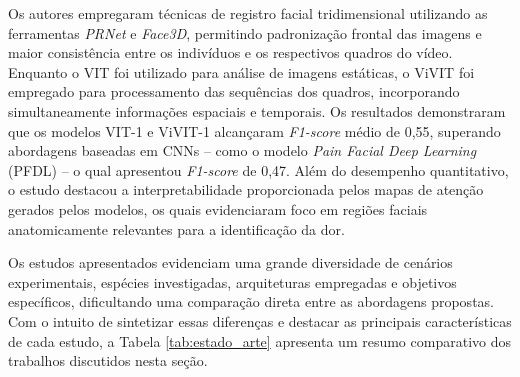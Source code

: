 Os autores empregaram técnicas de registro facial tridimensional utilizando as ferramentas \textit{PRNet} e \textit{Face3D}, permitindo padronização frontal das imagens e maior consistência entre os indivíduos e os respectivos quadros do vídeo. Enquanto o \acs{VIT} foi utilizado para análise de imagens estáticas, o \acs{ViVIT} foi empregado para processamento das sequências dos quadros, incorporando simultaneamente informações espaciais e temporais. Os resultados demonstraram que os modelos \acs{VIT}-1 e \acs{ViVIT}-1 alcançaram \textit{F1-score} médio de 0,55, superando abordagens baseadas em \acsp{CNN} -- como o modelo \textit{Pain Facial Deep Learning} (\acs{PFDL}) -- o qual apresentou \textit{F1-score} de 0,47. Além do desempenho quantitativo, o estudo destacou a interpretabilidade proporcionada pelos mapas de atenção gerados pelos modelos, os quais evidenciaram foco em regiões faciais anatomicamente relevantes para a identificação da dor.

Os estudos apresentados evidenciam uma grande diversidade de cenários experimentais, espécies investigadas, arquiteturas empregadas e objetivos específicos, dificultando uma comparação direta entre as abordagens propostas. Com o intuito de sintetizar essas diferenças e destacar as principais características de cada estudo, a Tabela \ref{tab:estado_arte} apresenta um resumo comparativo dos trabalhos discutidos nesta seção.

